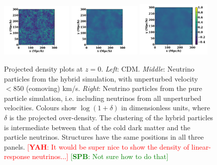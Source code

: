 \documentclass[useAMS, usenatbib]{mnras}
\newcommand{\spb}[1]{{\textcolor{green}{[{\bf SPB}: #1]}}}
\newcommand{\yah}[1]{{\textcolor{red}{[{\bf YAH}: #1]}}}
\begin{document}
\begin{figure}
\includegraphics[trim={1.cm 0 1.5cm 0},clip,width=0.31\textwidth]{nuplots/dens-plt-b300p512nu0_4hybt1.pdf}
\includegraphics[trim={1cm 0 1.5cm 0},clip, width=0.31\textwidth]{nuplots/dens-plt-b300p512nu0_4hybt2.pdf}
\includegraphics[trim={1.5cm 0 0.5cm 0},clip, width=0.322\textwidth]{nuplots/dens-plt-b300p512nu0_4pt2.pdf}
  \caption{Projected density plots at $z=0$. \emph{Left}: CDM. \emph{Middle}: Neutrino particles from the hybrid simulation, with unperturbed velocity $<850$ (comoving) km/s. \emph{Right}: Neutrino particles from the pure particle simulation, i.e. including neutrinos from all unperturbed velocities. Colours show $\log (1+ \delta)$ in dimensionless units, where $\delta$ is the projected over-density.
  The clustering of the hybrid particles is intermediate between that of the cold dark matter and the particle neutrinos. Structures have the same positions in all three panels. \yah{It would be super nice to show the density of linear-response neutrinos...} \spb{Not sure how to do that}}
  \label{fig:density_plot}
\end{figure}
\end{document}
